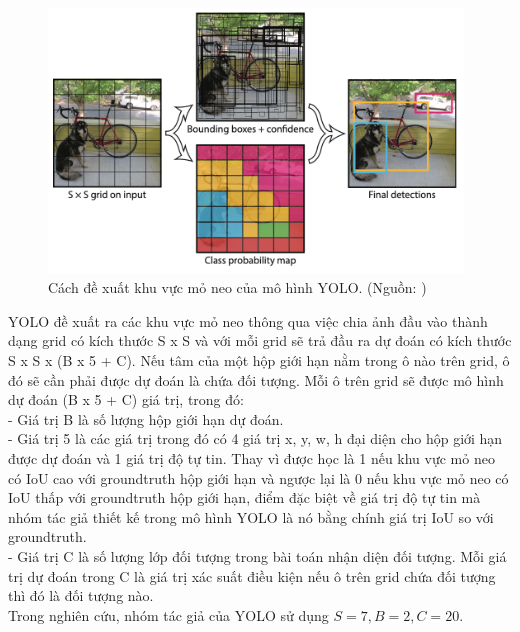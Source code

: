 {    \begin{figure}[H]
        \centering
        \includegraphics[width=11cm] {images/yolo_anchor}
        \caption{Cách đề xuất khu vực mỏ neo của mô hình YOLO. (Nguồn: \cite{redmon2016look})}
        \label{fig:yolo_anchor}
    \end{figure}

    \noindent
    YOLO đề xuất ra các khu vực mỏ neo thông qua việc chia ảnh đầu vào thành dạng grid có kích thước S x S và với mỗi grid sẽ trả đầu ra dự đoán có kích thước S x S x (B x 5 + C).
    Nếu tâm của một hộp giới hạn nằm trong ô nào trên grid, ô đó sẽ cần phải được dự đoán là chứa đối tượng.
    Mỗi ô trên grid sẽ được mô hình dự đoán (B x 5 + C) giá trị, trong đó: \\
    - Giá trị B là số lượng hộp giới hạn dự đoán. \\
    - Giá trị 5 là các giá trị trong đó có 4 giá trị x, y, w, h đại diện cho hộp giới hạn được dự đoán và 1 giá trị độ tự tin.
    Thay vì được học là 1 nếu khu vực mỏ neo có IoU cao với groundtruth hộp giới hạn và ngược lại là 0 nếu khu vực mỏ neo có IoU thấp với groundtruth hộp giới hạn, điểm đặc biệt về giá trị độ tự tin mà nhóm tác giả thiết kế trong mô hình YOLO là nó bằng chính giá trị IoU so với groundtruth. \\
    - Giá trị C là số lượng lớp đối tượng trong bài toán nhận diện đối tượng.
    Mỗi giá trị dự đoán trong C là giá trị xác suất điều kiện nếu ô trên grid chứa đối tượng thì đó là đối tượng nào. \\
    Trong nghiên cứu, nhóm tác giả của YOLO sử dụng $S = 7, B = 2, C = 20$.

}
